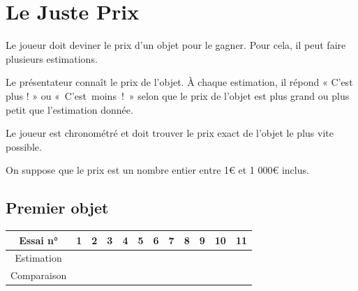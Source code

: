 

\SetDate[17/04/2026]

\usepackage{minted}

\def\arraystretch{2}
\setlength\tabcolsep{18pt}


\pagestyle{fancy}
\fancyhead[R]{\today}

\section*{Le Juste Prix}

\begin{namedtheorem}
	Le joueur doit deviner le prix d'un objet pour le gagner.
	Pour cela, il peut faire plusieurs estimations.
	
	Le présentateur connaît le prix de l'objet. 
	À chaque estimation, il répond « C'est plus ! » ou \mbox{« C'est moins ! »} selon que le prix de l'objet est plus grand ou plus petit que l'estimation donnée.
	
	Le joueur est chronométré et doit trouver le prix exact de l'objet le plus vite possible.
\end{namedtheorem}

	On suppose que le prix est un nombre entier entre 1€ et 1 000€ inclus.

\subsection*{Premier objet}



\hspace{-65pt}
\begin{tabular}{|*{12}{c|}}\hline
	Essai n° & 1 & 2 & 3 & 4 & 5 & 6 & 7 & 8 & 9 & 10 & 11
	\\\hline
	Estimation & & & & & & & & & & & 
	\\\hline
	Comparaison & & & & & & & & & & &
	\\\hline
\end{tabular}


